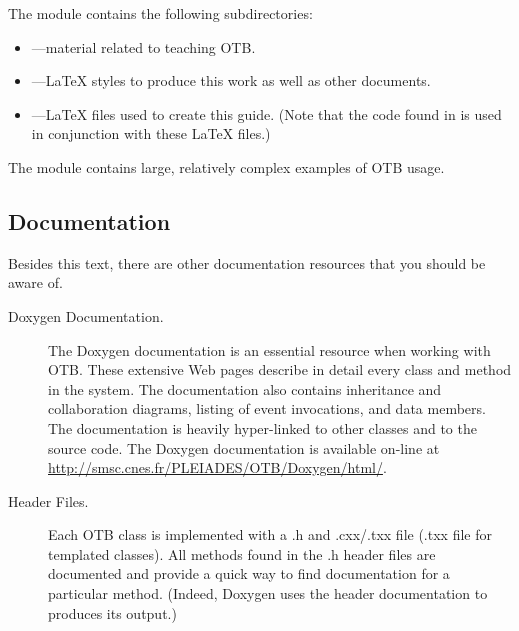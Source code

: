 The  module contains the following subdirectories:
\begin{itemize}
        \item {}---material related to
        teaching OTB.
        \item {}---\LaTeX{} styles to produce this
        work as well as other documents.
        \item {}---\LaTeX{} files used to
        create this guide. (Note that the code found in
         is used in conjunction with these \LaTeX{}
        files.)
\end{itemize}

The  module contains large, relatively complex
examples of OTB usage.%


\subsection{Documentation}
\label{sec:Documentation}

Besides this text, there are other documentation resources that you should be
aware of.
\begin{description}
        \item[Doxygen Documentation.] The Doxygen documentation is an
        essential resource when working with OTB. These extensive Web
        pages describe in detail every class and method in the
        system. The documentation also contains inheritance and
        collaboration diagrams, listing of event invocations, and data
        members. The documentation is heavily hyper-linked to other
        classes and to the source code. The Doxygen documentation is
        available on-line at
        \url{http://smsc.cnes.fr/PLEIADES/OTB/Doxygen/html/}.

	\item[Header Files.] Each OTB class is implemented with a .h and
        .cxx/.txx file (.txx file for templated classes). All methods
        found in the .h header files are documented and provide a quick way
        to find documentation for a particular method. (Indeed, Doxygen uses
        the header documentation to produces its output.)
\end{description}

